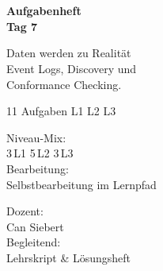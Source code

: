 \documentclass[11pt,a4paper,oneside]{article}
\begin{document}
\begin{titlepage}
  \pagestyle{empty}
  \vspace*{1.5cm}
  \\[2pt]
  \noindent{\color{lpAccent}\rule{\linewidth}{1.2pt}}\\[4pt]

  \vspace{3cm}
  {\sffamily\fontsize{30}{34}\selectfont\bfseries\color{lpInk}Aufgabenheft\\Tag 7\par}

  \vspace{0.7cm}
  {\sffamily\large\color{lpGray}Daten werden zu Realit\"at \textendash{}\\Event Logs, Discovery und\\Conformance Checking.\par}

  \vspace{1.5cm}
  {\caveatfont\LARGE\color{lpAmber}11 Aufgaben \textperiodcentered{} L1 \textperiodcentered{} L2 \textperiodcentered{} L3}\par

  \vfill

  \noindent\begin{minipage}{0.55\linewidth}
    {\sffamily\footnotesize\color{lpGray}Niveau-Mix:}\\
    {\sffamily\small\color{lpInk}3\,\textsf{L1} \textperiodcentered{} 5\,\textsf{L2} \textperiodcentered{} 3\,\textsf{L3}}\\[10pt]
    {\sffamily\footnotesize\color{lpGray}Bearbeitung:}\\
    {\sffamily\small\color{lpInk}Selbstbearbeitung im Lernpfad}
  \end{minipage}\hfill
  \begin{minipage}{0.4\linewidth}
    \raggedleft
    {\sffamily\footnotesize\color{lpGray}Dozent:}\\
    {\sffamily\small\color{lpInk}Can Siebert}\\[10pt]
    {\sffamily\footnotesize\color{lpGray}Begleitend:}\\
    {\sffamily\small\color{lpInk}Lehrskript \& L\"osungsheft}
  \end{minipage}

  \vspace{0.5cm}
  \noindent{\color{lpAccent}\rule{\linewidth}{0.6pt}}
\end{titlepage}
\end{document}
